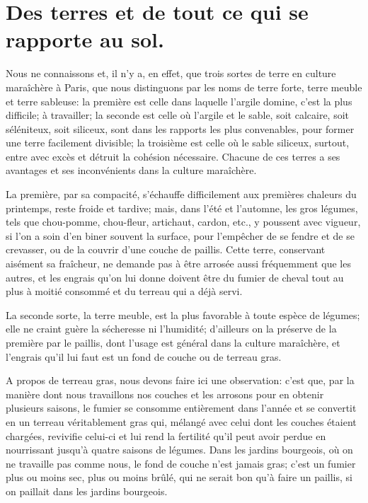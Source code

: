\documentclass[10pt,a4paper]{book}
\begin{document}
\chapter{Des terres et de tout ce qui se rapporte au sol.}

Nous ne connaissons et, il n'y a, en effet, que trois sortes de terre en culture maraîchère à Paris, que nous distinguons par les noms de terre forte, terre meuble et terre sableuse: la première est celle dans laquelle l'argile domine, c'est la plus difficile; à travailler; la seconde est celle où l'argile et le sable, soit calcaire, soit séléniteux, soit siliceux, sont dans les rapports les plus convenables, pour former une terre facilement divisible; la troisième est celle où le sable siliceux, surtout, entre avec excès et détruit la cohésion nécessaire. Chacune de ces terres a ses avantages et ses inconvénients dans la culture maraîchère.

La première, par sa compacité, s'échauffe difficilement aux premières chaleurs du printemps, reste froide et tardive; mais, dans l'été et l'automne, les gros légumes, tels que chou-pomme, chou-fleur, artichaut, cardon, etc., y poussent avec vigueur, si l'on a soin d'en biner souvent la surface, pour l'empêcher de se fendre et de se crevasser, ou de la couvrir d'une couche de paillis. Cette terre, conservant aisément sa fraîcheur, ne demande pas à être arrosée aussi fréquemment que les autres, et les engrais qu'on lui donne doivent être du fumier de cheval tout au plus à moitié consommé et du terreau qui a déjà servi.

La seconde sorte, la terre meuble, est la plus favorable à toute espèce de légumes; elle ne craint guère la sécheresse ni l'humidité; d'ailleurs on la préserve de la première par le paillis, dont l'usage est général dans la culture maraîchère, et l'engrais qu'il lui faut est un fond de couche ou de terreau gras.

A propos de terreau gras, nous devons faire ici une observation: c'est que, par la manière dont nous travaillons nos couches et les arrosons pour en obtenir plusieurs saisons, le fumier se consomme entièrement dans l'année et se convertit en un terreau véritablement gras qui, mélangé avec celui dont les couches étaient chargées, revivifie celui-ci et lui rend la fertilité qu'il peut avoir perdue en nourrissant jusqu'à quatre saisons de légumes. Dans les jardins bourgeois, où on ne travaille pas comme nous, le fond de couche n'est jamais gras; c'est un fumier plus ou moins sec, plus ou moins brûlé, qui ne serait bon qu'à faire un paillis, si on paillait dans les jardins bourgeois.
\end{document}
